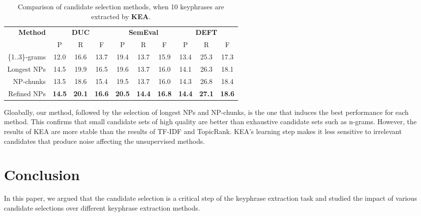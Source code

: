       \begin{table}
        \centering
        \begin{tabular}{rccccccccc}
          \toprule
          \multirow{2}{*}[-2pt]{\textbf{Method}} & \multicolumn{3}{c}{\textbf{DUC}} & \multicolumn{3}{c}{\textbf{SemEval}} & \multicolumn{3}{c}{\textbf{DEFT}}\\
          \cmidrule(r){2-4}\cmidrule(lr){5-7}\cmidrule(l){8-10}
          & P & R & F & P & R & F & P & R & F\\
          \midrule
          \{1..3\}-grams & 12.0 & 16.6 & 13.7 & 19.4 & 13.7 & 15.9 & 13.4 & 25.3 & 17.3\\
          Longest NPs & 14.5 & 19.9 & 16.5 & 19.6 & 13.7 & 16.0 & 14.1 & 26.3 & 18.1\\
          NP-chunks & 13.5 & 18.6 & 15.4 & 19.5 & 13.7 & 16.0 & 14.3 & 26.8 & 18.4\\
          Refined NPs & \textbf{14.5} & \textbf{20.1} & \textbf{16.6} & \textbf{20.5} & \textbf{14.4} & \textbf{16.8} & \textbf{14.4} & \textbf{27.1} & \textbf{18.6}\\
          \bottomrule
        \end{tabular}
        \caption{Comparison of candidate selection methods, when 10 keyphrases
                 are extracted by \textbf{KEA}.
                 \label{tab:kea_results}}
      \end{table}
      
      Gloabally, our method, followed by the selection of longest NPs and
      NP-chunks, is the one that induces the best performance for each method.
      This confirms that small candidate sets of high quality are better than
      exhaustive candidate sets such as n-grams. However, the results of KEA are
      more stable than the results of TF-IDF and TopicRank. KEA's learning step
      makes it less sensitive to irrelevant candidates that produce noise
      affecting the unsupervised methods. 

\section{Conclusion}
\label{sec:conclusion}
  In this paper, we argued that the candidate selection is a critical step of
  the keyphrase extraction task and studied the impact of various candidate
  selections over different keyphrase extraction methods.

